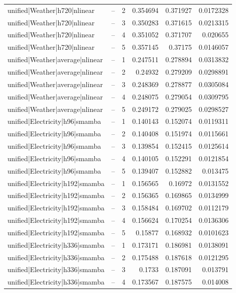 \begin{longtable}{llrrrr}
unified|Weather|h720|nlinear & -- & 2 & 0.354694 & 0.371927 & 0.0172328 \\
unified|Weather|h720|nlinear & -- & 3 & 0.350283 & 0.371615 & 0.0213315 \\
unified|Weather|h720|nlinear & -- & 4 & 0.351052 & 0.371707 & 0.020655 \\
unified|Weather|h720|nlinear & -- & 5 & 0.357145 & 0.37175 & 0.0146057 \\
unified|Weather|average|nlinear & -- & 1 & 0.247511 & 0.278894 & 0.0313832 \\
unified|Weather|average|nlinear & -- & 2 & 0.24932 & 0.279209 & 0.0298891 \\
unified|Weather|average|nlinear & -- & 3 & 0.248369 & 0.278877 & 0.0305084 \\
unified|Weather|average|nlinear & -- & 4 & 0.248075 & 0.279054 & 0.0309795 \\
unified|Weather|average|nlinear & -- & 5 & 0.249172 & 0.279025 & 0.0298527 \\
unified|Electricity|h96|smamba & -- & 1 & 0.140143 & 0.152074 & 0.0119311 \\
unified|Electricity|h96|smamba & -- & 2 & 0.140408 & 0.151974 & 0.0115661 \\
unified|Electricity|h96|smamba & -- & 3 & 0.139854 & 0.152415 & 0.0125614 \\
unified|Electricity|h96|smamba & -- & 4 & 0.140105 & 0.152291 & 0.0121854 \\
unified|Electricity|h96|smamba & -- & 5 & 0.139407 & 0.152882 & 0.013475 \\
unified|Electricity|h192|smamba & -- & 1 & 0.156565 & 0.16972 & 0.0131552 \\
unified|Electricity|h192|smamba & -- & 2 & 0.156365 & 0.169865 & 0.0134999 \\
unified|Electricity|h192|smamba & -- & 3 & 0.158484 & 0.169702 & 0.0112179 \\
unified|Electricity|h192|smamba & -- & 4 & 0.156624 & 0.170254 & 0.0136306 \\
unified|Electricity|h192|smamba & -- & 5 & 0.15877 & 0.168932 & 0.0101623 \\
unified|Electricity|h336|smamba & -- & 1 & 0.173171 & 0.186981 & 0.0138091 \\
unified|Electricity|h336|smamba & -- & 2 & 0.175488 & 0.187618 & 0.0121295 \\
unified|Electricity|h336|smamba & -- & 3 & 0.1733 & 0.187091 & 0.013791 \\
unified|Electricity|h336|smamba & -- & 4 & 0.173567 & 0.187575 & 0.014008 \\

\end{longtable}
